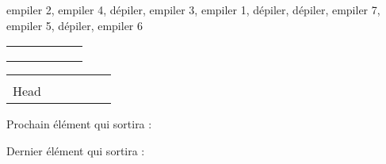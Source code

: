 \documentclass[11pt,a4paper]{article}
\begin{document}
\begin{center}

\begin{large}
empiler 2, empiler 4, dépiler, empiler 3, empiler 1, dépiler, dépiler, empiler 7, empiler 5, dépiler, empiler 6
\end{large}

\bigskip

\begin{tabular}{ | C{1cm} | C{1cm} | C{1cm} | C{1cm} | C{1cm} | C{1cm} | }
  \hline
     &    &    &    &    &    \\
     &    &    &    &    &    \\
     &    &    &    &    &    \\
  \hline
\end{tabular}

\smallskip

\begin{tabular}{   C{1cm}   C{1cm}   C{1cm}   C{1cm}   C{1cm}   C{1cm}   }
   &  &  &  &  &  \\
  Head &  &  &  &  &  \\
\end{tabular}






\begin{table}[ht!]
  \begin{minipage}{0.50\textwidth}

Prochain élément qui sortira :

  \end{minipage}
  \hfillx
  \begin{minipage}{0.50\textwidth}

Dernier élément qui sortira :

  \end{minipage}
\end{table}
\end{center}
\end{document}

